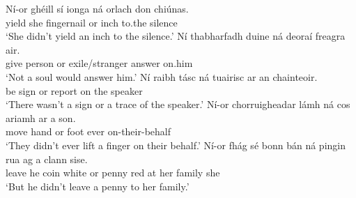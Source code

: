 \documentclass[output=paper,colorlinks,citecolor=brown]{langscibook}
\begin{document}
\ea
\ea
\gll Ní-or ghéill sí  ionga ná orlach don chiúnas. \\
     {\nior} {yield\past} she fingernail or inch to.the silence \\
\glt `She didn't yield an inch to the silence.'           %
\ex
\gll Ní thabharfadh  duine ná deoraí freagra air. \\
     {\no}  {give\cond} person or exile/stranger answer on.him \\
\glt `Not a soul would answer him.' %
\ex
\gll Ní raibh  tásc ná tuairisc ar an chainteoir. \\
     {\nior} {be\past} sign or report on the speaker \\
\glt `There wasn't a sign or a trace of the speaker.' %
\ex
\gll Ní-or chorruigheadar  lámh ná cos ariamh {ar a son}. \\
    {\nior} {move\past\their} hand or foot ever on-their-behalf \\
\glt `They didn't ever lift a finger on their behalf.'  %
\ex
\gll Ní-or fhág sé bonn bán ná pingin rua ag a clann sise. \\
     {\nior} {leave\past} he coin white or penny red at her family she \\
\glt `But he didn't leave a penny to her family.'
\z
\z

\end{document}
